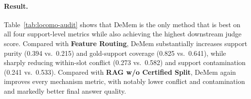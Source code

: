 \documentclass{article}
\theoremstyle{plain}
\theoremstyle{definition}
\theoremstyle{remark}
\begin{document}
\begin{table}[t]
\centering
\small
{}
\caption{Decision-compatibility audit on an annotated \textbf{LoCoMo} subset under a matched answer stack.
DeMem achieves the highest support purity and gold-support coverage, while simultaneously attaining the lowest within-slot conflict and support contamination.
It is also the strongest method on the final judge score.
Together, these results show that the gain of DeMem is reflected not only in answer quality, but also in a more decision-compatible organization of memory under the same runtime budget.}
\label{tab:locomo-audit}
\end{table}

\paragraph{Result.}
Table~\ref{tab:locomo-audit} shows that DeMem is the only method that is best on all four support-level metrics while also achieving the highest downstream judge score.
Compared with \textbf{Feature Routing}, DeMem substantially increases support purity (0.394 vs.\ 0.215) and gold-support coverage (0.825 vs.\ 0.641), while sharply reducing within-slot conflict (0.273 vs.\ 0.582) and support contamination (0.241 vs.\ 0.533).
Compared with \textbf{RAG w/o Certified Split}, DeMem again improves every mechanism metric, with notably lower conflict and contamination and markedly better final answer quality.
\end{document}
